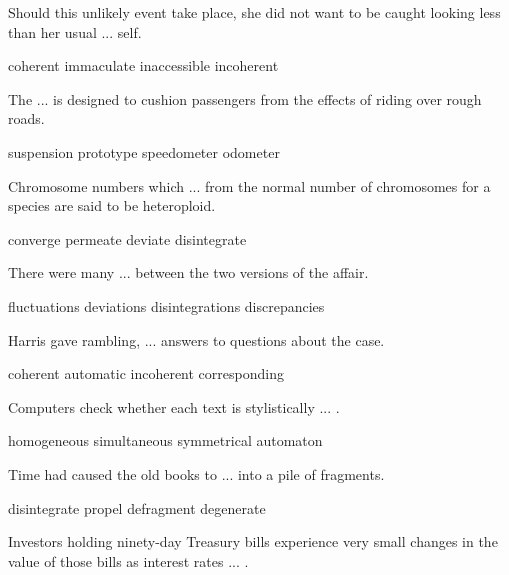 \documentclass{exam}
\begin{document}
\begin{questions}
\question Should this unlikely event take place, she did not want to be caught looking less than her usual ... self.\\
\begin{oneparchoices}
\choice coherent 
\correctchoice immaculate
 \choice inaccessible 
 \choice incoherent 
\end{oneparchoices}
\question The ... is designed to cushion passengers from the effects of riding over rough roads.\\
\begin{oneparchoices} 
\correctchoice suspension
 \choice prototype 
 \choice speedometer
 \choice odometer
\end{oneparchoices}
\question Chromosome numbers which ... from the normal number of chromosomes for a species are said to be heteroploid.\\
\begin{oneparchoices} 
\choice converge
 \choice permeate
\correctchoice deviate
 \choice disintegrate 
\end{oneparchoices}
\question There were many ... between the two versions of the affair.\\
\begin{oneparchoices} 
\choice fluctuations
\choice deviations
\choice disintegrations
\correctchoice discrepancies
\end{oneparchoices}
\question Harris gave rambling, ... answers to questions about the case.\\
\begin{oneparchoices} 
\choice coherent
\choice automatic
\correctchoice incoherent
\choice corresponding
\end{oneparchoices}
\question Computers check whether each text is stylistically ... .\\
\begin{oneparchoices} 
\correctchoice homogeneous
\choice simultaneous
\choice symmetrical
\choice automaton 
\end{oneparchoices}
\question Time had caused the old books to ... into a pile of fragments.\\
\begin{oneparchoices} 
\correctchoice disintegrate
\choice propel 
\choice defragment
\choice degenerate 
\end{oneparchoices}
\question Investors holding ninety-day Treasury bills experience very small changes in the value of those bills as interest rates ... .\\
\begin{oneparchoices}

\end{oneparchoices}
\end{questions}
\end{document}
